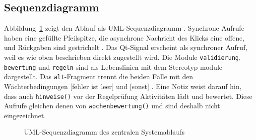 \subsection{Sequenzdiagramm}
Abbildung~\ref{abb:sequenz} zeigt den Ablauf als \ac{UML}-Sequenzdiagramm \parencite[S.~595]{omg2017uml}. Synchrone Aufrufe haben eine gefüllte Pfeilspitze, die asynchrone Nachricht des Klicks eine offene, und Rückgaben sind gestrichelt \parencite[S.~576]{omg2017uml}. Das Qt-Signal erscheint als synchroner Aufruf, weil es wie oben beschrieben direkt zugestellt wird. Die Module \texttt{validierung}, \texttt{bewertung} und \texttt{regeln} sind als Lebenslinien mit dem Stereotyp \guillemotleft module\guillemotright{} dargestellt. Das \texttt{alt}-Fragment trennt die beiden Fälle mit den Wächterbedingungen [fehler ist leer] und [sonst] \parencite[S.~585]{omg2017uml}. Eine Notiz weist darauf hin, dass auch \texttt{hinweise()} vor der Regelprüfung Aktivitäten lädt und bewertet. Diese Aufrufe gleichen denen von \texttt{wochenbewertung()} und sind deshalb nicht eingezeichnet.

\begin{figure}[H]
  \caption{UML-Sequenzdiagramm des zentralen Systemablaufs}\label{abb:sequenz}
  \centering
\end{figure}
